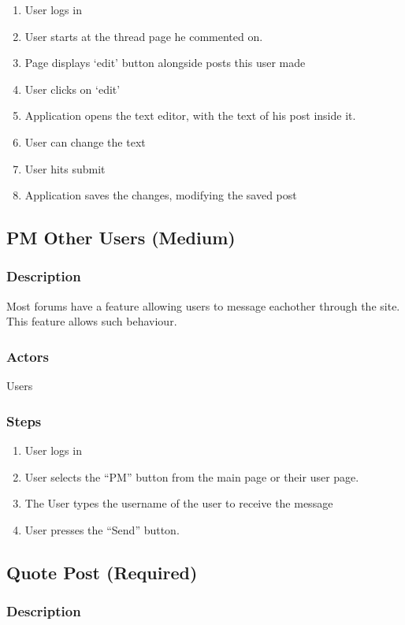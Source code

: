 \documentclass[12pt]{scrartcl}
\begin{document}
\begin{enumerate}
\item User logs in
\item User starts at the thread page he commented on.
\item Page displays ‘edit’ button alongside posts this user made
\item User clicks on ‘edit’
\item Application opens the text editor, with the text of his post inside it.
\item User can change the text
\item User hits submit
\item  Application saves the changes, modifying the saved post
\end{enumerate}

\subsection{PM Other Users (Medium)}
\subsubsection{Description}

Most forums have a feature allowing users to message eachother through the site. This
feature allows such behaviour.

\subsubsection{Actors}

Users

\subsubsection{Steps}
\begin{enumerate}
\item User logs in
\item User selects the ``PM'' button from the main page or their user page.
\item The User types the username of the user to receive the message
\item User presses the ``Send'' button.
\end{enumerate}

\subsection{Quote Post (Required)}
\subsubsection{Description}
\end{document}
